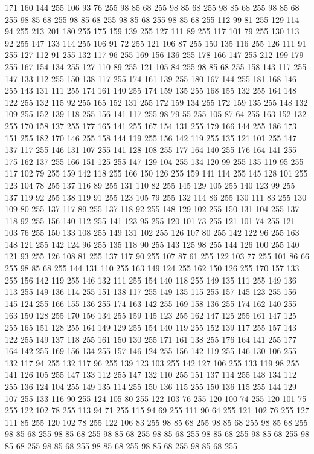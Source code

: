 171 160 144 255 106 93 76 255 98 85 68 255 98 85 68 255 98 85 68 255 98 85 68 255 98 85 68 255 98 85 68 255 98 85 68 255 98 85 68 255 112 99 81 255 129 114 94 255 213 201 180 255 175 159 139 255 127 111 89 255 117 101 79 255 130 113 92 255 147 133 114 255 106 91 72 255 121 106 87 255 150 135 116 255 126 111 91 255 127 112 91 255 132 117 96 255 169 156 136 255 178 166 147 255 212 199 179 255 167 154 134 255 127 110 89 255 121 105 84 255 98 85 68 255 158 143 117 255 147 133 112 255 150 138 117 255 174 161 139 255 180 167 144 255 181 168 146 255 143 131 111 255 174 161 140 255 174 159 135 255 168 155 132 255 164 148 122 255 132 115 92 255 165 152 131 255 172 159 134 255 172 159 135 255 148 132 109 255 152 139 118 255 156 141 117 255 98 79 55 255 105 87 64 255 163 152 132 255 170 158 137 255 177 165 141 255 167 154 131 255 179 166 144 255 186 173 151 255 182 170 146 255 158 144 119 255 156 142 119 255 135 121 101 255 147 137 117 255 146 131 107 255 141 128 108 255
177 164 140 255 176 164 141 255 175 162 137 255 166 151 125 255 147 129 104 255 134 120 99 255 135 119 95 255 117 102 79 255 159 142 118 255 166 150 126 255 159 141 114 255 145 128 101 255 123 104 78 255 137 116 89 255 131 110 82 255 145 129 105 255 140 123 99 255 137 119 92 255 138 119 91 255 123 105 79 255 132 114 86 255 130 111 83 255 130 109 80 255 137 117 89 255 137 118 92 255 148 129 102 255 150 131 104 255 137 118 92 255 156 140 112 255 141 123 95 255 120 101 73 255 121 101 74 255 121 103 76 255 150 133 108 255 149 131 102 255 126 107 80 255 142 122 96 255 163 148 121 255 142 124 96 255 135 118 90 255 143 125 98 255 144 126 100 255 140 121 93 255 126 108 81 255 137 117 90 255 107 87 61 255 122 103 77 255 101 86 66 255 98 85 68 255 144 131 110 255 163 149 124 255 162 150 126 255 170 157 133 255 156 142 119 255 146 132 111 255 154 140 118 255 149 135 111 255 149 136 113 255 149 136 114 255 151 138 117 255 149 135 115 255 157 145 123 255 156 145 124 255 166 155 136 255
174 163 142 255 169 158 136 255 174 162 140 255 163 150 128 255 170 156 134 255 159 145 123 255 162 147 125 255 161 147 125 255 165 151 128 255 164 149 129 255 154 140 119 255 152 139 117 255 157 143 122 255 149 137 118 255 161 150 130 255 171 161 138 255 176 164 141 255 177 164 142 255 169 156 134 255 157 146 124 255 156 142 119 255 146 130 106 255 132 117 94 255 132 117 96 255 139 123 103 255 142 127 106 255 133 119 98 255 141 126 105 255 147 133 112 255 147 132 110 255 151 137 114 255 148 134 112 255 136 124 104 255 149 135 114 255 150 136 115 255 150 136 115 255 144 129 107 255 133 116 90 255 124 105 80 255 122 103 76 255 120 100 74 255 120 101 75 255 122 102 78 255 113 94 71 255 115 94 69 255 111 90 64 255 121 102 76 255 127 111 85 255 120 102 78 255 122 106 83 255 98 85 68 255 98 85 68 255 98 85 68 255 98 85 68 255 98 85 68 255 98 85 68 255 98 85 68 255 98 85 68 255 98 85 68 255 98 85 68 255 98 85 68 255 98 85 68 255 98 85 68 255 98 85 68 255
